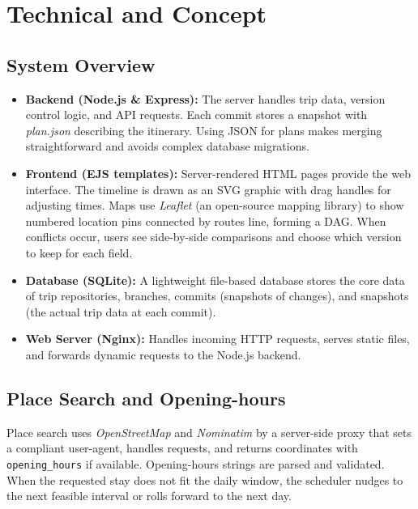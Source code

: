 \documentclass{article}
\begin{document}
\section{Technical and Concept}

\subsection{System Overview}
\begin{itemize}
  \item \textbf{Backend (Node.js \& Express):} The server handles trip data, version control logic, and API requests. Each commit stores a snapshot with \textit{plan.json} describing the itinerary. Using JSON for plans makes merging straightforward and avoids complex database migrations\cite{json-merge-patch}.
  
  \item \textbf{Frontend (EJS templates):} Server-rendered HTML pages provide the web interface. The timeline is drawn as an SVG graphic with drag handles for adjusting times. Maps use \textit{Leaflet} (an open-source mapping library) to show numbered location pins connected by routes line, forming a DAG. When conflicts occur, users see side-by-side comparisons and choose which version to keep for each field.
  
  \item \textbf{Database (SQLite):} A lightweight file-based database stores the core data of trip repositories, branches, commits (snapshots of changes), and snapshots (the actual trip data at each commit).
  
  \item \textbf{Web Server (Nginx):} Handles incoming HTTP requests, serves static files, and forwards dynamic requests to the Node.js backend.
\end{itemize}

\subsection{Place Search and Opening-hours}
Place search uses \textit{OpenStreetMap} and \textit{Nominatim} by a server-side proxy that sets a compliant user-agent, handles requests, and returns coordinates with \texttt{opening\_hours} if available. Opening-hours strings are parsed and validated. When the requested stay does not fit the daily window, the scheduler nudges to the next feasible interval or rolls forward to the next day.
\end{document}
